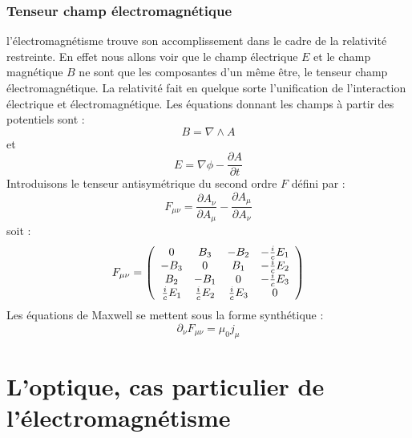 \documentclass[12pt]{book}
\begin{document}
\subsubsection{Tenseur champ \'electromagn\'etique}
l'\'electromagn\'etisme trouve son accomplissement dans le cadre de la
relativit\'e restreinte. En effet nous allons voir que le champ
\'electrique $E$ et le champ magn\'etique $B$ ne sont que les composantes
d'un m\^eme \^etre, le tenseur champ \'electromagn\'etique. La relativit\'e fait
en quelque sorte l'unification de l'interaction \'electrique et
\'electromagn\'etique.
Les \'equations donnant les champs \`a partir des potentiels sont :
\begin{equation}
B=\nabla\wedge A
\end{equation}
et 
\begin{equation}
E=\nabla \phi-\frac{\partial A}{\partial t}
\end{equation}
Introduisons le tenseur antisym\'etrique  du second ordre $F$ d\'efini par
: 
\begin{equation}
F_{\mu\nu}=\frac{\partial A_{\nu}}{\partial A_{\mu}}-\frac{\partial A_{\mu}}{\partial A_{\nu}}
\end{equation}
soit :
\begin{equation}
F_{\mu\nu}=
\left( \begin{array}{cccc}
0&B_3&-B_2&-\frac{i}{c}E_1\cr
-B_3&0&B_1&-\frac{i}{c}E_2\cr
B_2&-B_1&0&-\frac{i}{c}E_3\cr
\frac{i}{c}E_1&\frac{i}{c}E_2&\frac{i}{c}E_3&0\cr
\end{array} \right)
\end{equation}
Les \'equations de Maxwell se mettent sous la forme synth\'etique :
\begin{equation}
\partial_{\nu}F_{\mu\nu}=\mu_0j_{\mu}
\end{equation}

\section{L'optique, cas particulier de l'\'electromagn\'etisme}
\end{document}
